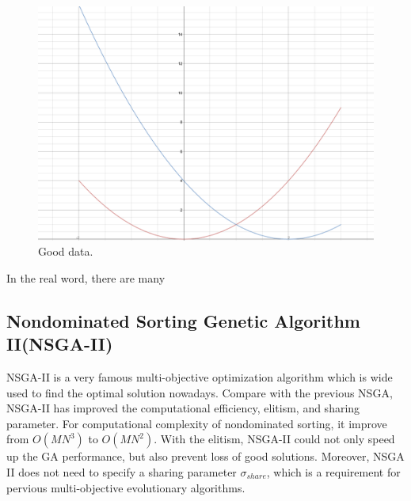 \begin{figure}[htp] 
\centering
\includegraphics[scale=.4]{images/Figure_1.png}
\caption{Good data.}
\label{fig:goodData}
\end{figure}

In the real word, there are many

\subsection{Nondominated Sorting Genetic Algorithm II(NSGA-II)}
NSGA-II\cite{NSGA-II} is a very famous multi-objective optimization algorithm which is wide used  to find the optimal solution nowadays. Compare with the previous NSGA, NSGA-II has improved the computational efficiency, elitism, and sharing parameter. For computational complexity of nondominated sorting, it improve from \(O(MN^{3})\) to \(O(MN^{2})\). With the elitism, NSGA-II could not only speed up the GA performance, but also prevent loss of good solutions. Moreover, NSGA II does not need to specify a sharing parameter \(\sigma_{share}\), which is a requirement for pervious multi-objective evolutionary algorithms.
